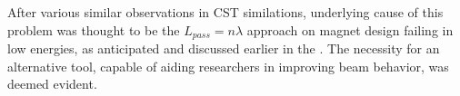 \documentclass{article}
\begin{document}
After various similar observations in CST similations, underlying cause of this problem was thought to be the $L_{pass} = n \lambda$ approach on magnet design failing in low energies, 
as anticipated and discussed earlier in the .
The necessity for an alternative tool, capable of aiding researchers in improving beam behavior, was deemed evident.

\end{document}
